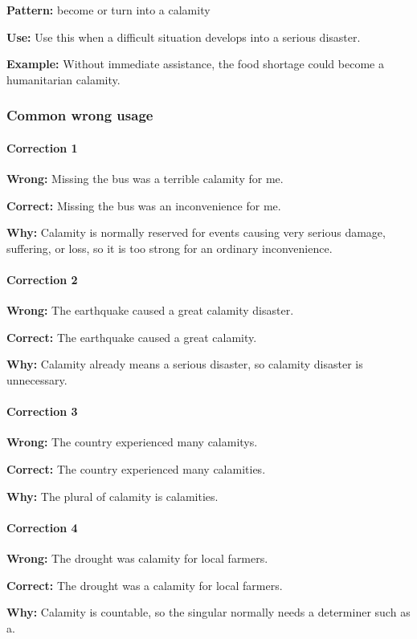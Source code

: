\documentclass[11pt]{article}
\begin{document}
\textbf{Pattern:} become or turn into a calamity

\textbf{Use:} Use this when a difficult situation develops into a serious disaster.

\textbf{Example:} Without immediate assistance, the food shortage could become a humanitarian calamity.

\subsubsection{Common wrong usage}
\paragraph{Correction 1}
\textbf{Wrong:} Missing the bus was a terrible calamity for me.

\textbf{Correct:} Missing the bus was an inconvenience for me.

\textbf{Why:} Calamity is normally reserved for events causing very serious damage, suffering, or loss, so it is too strong for an ordinary inconvenience.

\paragraph{Correction 2}
\textbf{Wrong:} The earthquake caused a great calamity disaster.

\textbf{Correct:} The earthquake caused a great calamity.

\textbf{Why:} Calamity already means a serious disaster, so calamity disaster is unnecessary.

\paragraph{Correction 3}
\textbf{Wrong:} The country experienced many calamitys.

\textbf{Correct:} The country experienced many calamities.

\textbf{Why:} The plural of calamity is calamities.

\paragraph{Correction 4}
\textbf{Wrong:} The drought was calamity for local farmers.

\textbf{Correct:} The drought was a calamity for local farmers.

\textbf{Why:} Calamity is countable, so the singular normally needs a determiner such as a.
\end{document}

